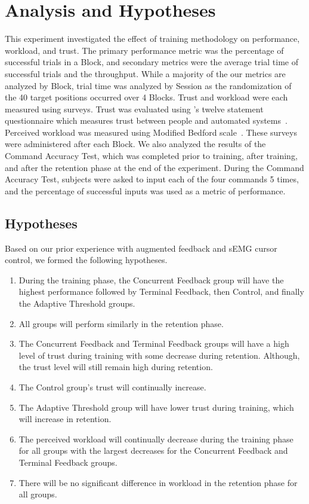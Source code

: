 \section{Analysis and Hypotheses}
This experiment investigated the effect of training methodology on performance, workload, and trust.
The primary performance metric was the percentage of successful trials in a Block, and secondary metrics were the average trial time of successful trials and the throughput.
While a majority of the our metrics are analyzed by Block, trial time was analyzed by Session as the randomization of the 40 target positions occurred over 4 Blocks.
Trust and workload were each measured using surveys.
Trust was evaluated using \citeauthor{jian_foundations_2000}'s twelve statement questionnaire which measures trust between people and automated systems~\citep{jian_foundations_2000}.
Perceived workload was measured using Modified Bedford scale~\citep{roscoe_subjective_1990}.
These surveys were administered after each Block.
We also analyzed the results of the Command Accuracy Test, which was completed prior to training, after training, and after the retention phase at the end of the experiment.
During the Command Accuracy Test, subjects were asked to input each of the four commands 5 times, and the percentage of successful inputs was used as a metric of performance.

\subsection{Hypotheses}
Based on our prior experience with augmented feedback and sEMG cursor control, we formed the following hypotheses.

\begin{enumerate}
	\item During the training phase, the Concurrent Feedback group will have the highest performance followed by Terminal Feedback, then Control, and finally the Adaptive Threshold groups.
	\item All groups will perform similarly in the retention phase.
	\item The Concurrent Feedback and Terminal Feedback groups will have a high level of trust during training with some decrease during retention.
	      Although, the trust level will still remain high during retention.
	\item The Control group's trust will continually increase.
	\item The Adaptive Threshold group will have lower trust during training, which will increase in retention.
	\item The perceived workload will continually decrease during the training phase for all groups with the largest decreases for the Concurrent Feedback and Terminal Feedback groups.
	\item There will be no significant difference in workload in the retention phase for all groups.
\end{enumerate}

